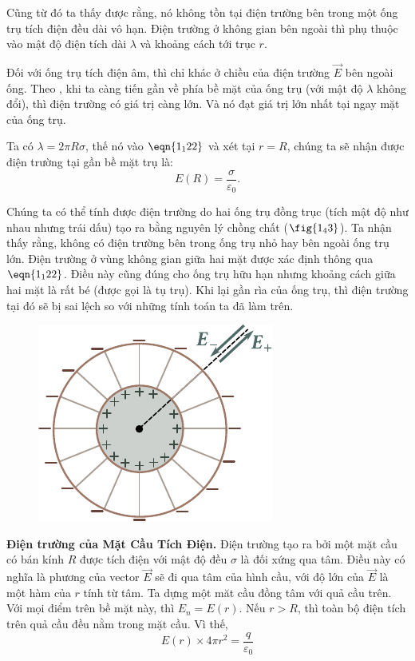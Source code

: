 Cũng từ đó ta thấy được rằng, nó không tồn tại điện trường bên trong một ống trụ tích điện đều dài vô hạn. Điện trường ở không gian bên ngoài thì phụ thuộc vào mật độ điện tích dài $\lambda$ và khoảng cách tới trục $r$.

Đối với ống trụ tích điện âm, thì chỉ khác ở chiều của điện trường $\vec{E}$ bên ngoài ống. Theo , khi ta càng tiến gần về phía bề mặt của ống trụ (với mật độ $\lambda$ không đổi), thì điện trường có giá trị càng lớn. Và nó đạt giá trị lớn nhất tại ngay mặt của ống trụ. 

Ta có $\lambda=2\pi R\sigma$, thế nó vào $\eqn{1_122}$ và xét tại $r=R$, chúng ta sẽ nhận được điện trường tại gần bề mặt trụ là: 
\begin{equation}\label{eq:1_123}
	E(R) = \frac{\sigma}{\varepsilon_0}.
\end{equation}

Chúng ta có thể tính được điện trường do hai ống trụ đồng trục (tích mật độ như nhau nhưng trái dấu) tạo ra bằng nguyên lý chồng chất ($\fig{1_43}$). Ta nhận thấy rằng, không có điện trường bên trong ống trụ nhỏ hay bên ngoài ống trụ lớn. Điện trường ở vùng không gian giữa hai mặt được xác định thông qua $\eqn{1_122}$. Điều này cũng đúng cho ống trụ hữu hạn nhưng khoảng cách giữa hai mặt là rất bé (được gọi là tụ trụ). Khi lại gần rìa của ống trụ, thì điện trường tại đó sẽ bị sai lệch so với những tính toán ta đã làm trên.

\begin{figure}[!htb]
	\begin{center}
		\includegraphics[scale=1]{figures/ch_01/fig_1_43.pdf}
		\caption[]{}
		\label{fig:1_43}
	\end{center}
	\vspace{-0.8cm}
\end{figure}

\textbf{Điện trường của Mặt Cầu Tích Điện.} Điện trường tạo ra bởi một mặt cầu có bán kính $R$ được tích điện với mật độ đều $\sigma$ là đối xứng qua tâm. Điều này có nghĩa là phương của vector $\vec{E}$ sẽ đi qua tâm của hình cầu, với độ lớn của $\vec{E}$ là một hàm của $r$ tính từ tâm. Ta dựng một măt cầu đồng tâm với quả cầu trên. Với mọi điểm trên bề mặt này, thì $E_n=E(r)$. Nếu $r>R$, thì toàn bộ điện tích trên quả cầu đều nằm trong mặt cầu. Vì thế,
\begin{equation*}
	E(r)\times 4\pi r^2 = \frac{q}{\varepsilon_0}
\end{equation*}

